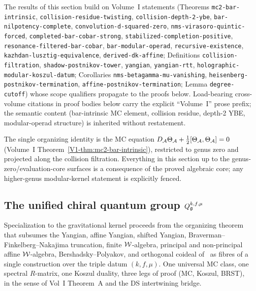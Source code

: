 \begin{remark}
The \ClaimStatusProvedHere{} results of this section build on Volume~I
statements (Theorems \texttt{mc2-bar-intrinsic},
\texttt{collision-residue-twisting},
\texttt{collision-depth-2-ybe},
\texttt{bar-nilpotency-complete},
\texttt{convolution-d-squared-zero},
\texttt{nms-virasoro-quintic-forced},
\texttt{completed-bar-cobar-strong},
\texttt{stabilized-completion-positive},
\texttt{resonance-filtered-bar-cobar},
\texttt{bar-modular-operad},
\texttt{recursive-existence},
\texttt{kazhdan-lusztig-equivalence},
\texttt{derived-dk-affine};
Definitions \texttt{collision-filtration},
\texttt{shadow-postnikov-tower},
\texttt{yangian}, \texttt{yangian-rtt},
\texttt{holographic-modular-koszul-datum};
Corollaries \texttt{nms-betagamma-mu-vanishing},
\texttt{heisenberg-postnikov-termination},
\texttt{affine-postnikov-termination};
Lemma \texttt{degree-cutoff}) whose scope qualifiers propagate
to the proofs below. Load-bearing cross-volume citations in proof
bodies below carry the explicit ``Volume~I'' prose prefix; the
semantic content (bar-intrinsic MC element, collision residue,
depth-2 YBE, modular-operad structure) is inherited without
restatement.
\end{remark}

The single organizing identity is the MC equation
$D_{\mathcal{A}}\Theta_{\mathcal{A}} + \tfrac{1}{2}[\Theta_{\mathcal{A}},\Theta_{\mathcal{A}}] = 0$
(Volume~I Theorem~\ref*{V1-thm:mc2-bar-intrinsic}), restricted to
genus zero and projected along the collision filtration.
Everything in this section up to the genus-zero/evaluation-core
surfaces is a consequence of the proved algebraic core; any
higher-genus modular-kernel statement is explicitly fenced.


\subsection{The unified chiral quantum group $Q_{\mathfrak{g}}^{k,f,\mu}$}
\label{subsec:unified-chiral-quantum-group}

Specialization to the gravitational kernel proceeds from the organizing
theorem that subsumes the Yangian, affine Yangian, shifted Yangian,
Braverman--Finkelberg--Nakajima truncation, finite $\mathcal{W}$-algebra,
principal and non-principal affine $\mathcal{W}$-algebra, Bershadsky--Polyakov,
and orthogonal coideal of~\cite{DNP25} as fibres of a single construction
over the triple datum $(k,f,\mu)$. One universal MC class, one spectral
$R$-matrix, one Koszul duality, three legs of proof (MC, Koszul,
BRST), in the sense of Vol~I Theorem~A and the DS intertwining bridge.

